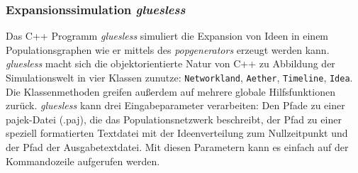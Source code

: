 \documentclass[openany,twoside,twocolumn]{book}
\begin{document}
\hypertarget{gluesless}{%
\subsubsection{\texorpdfstring{Expansionssimulation \emph{gluesless}}{Expansionssimulation gluesless}}\label{gluesless}}

Das C++ Programm \emph{gluesless} simuliert die Expansion von Ideen in einem Populationsgraphen wie er mittels des \emph{popgenerators} erzeugt werden kann. \emph{gluesless} macht sich die objektorientierte Natur von C++ zu Abbildung der Simulationswelt in vier Klassen zunutze: \texttt{Networkland}, \texttt{Aether}, \texttt{Timeline}, \texttt{Idea}. Die Klassenmethoden greifen außerdem auf mehrere globale Hilfsfunktionen zurück. \emph{gluesless} kann drei Eingabeparameter verarbeiten: Den Pfade zu einer pajek-Datei (.paj), die das Populationsnetzwerk beschreibt, der Pfad zu einer speziell formatierten Textdatei mit der Ideenverteilung zum Nullzeitpunkt und der Pfad der Ausgabetextdatei. Mit diesen Parametern kann es einfach auf der Kommandozeile aufgerufen werden.
\end{document}
